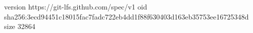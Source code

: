 version https://git-lfs.github.com/spec/v1
oid sha256:3ecd94451c18015fac7fadc722eb4dd1f88f630403d163eb35753ee16725348d
size 32864
